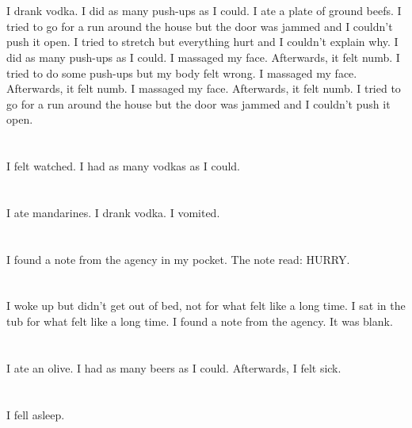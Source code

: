 \documentclass{article}
\begin{document}
    \section{}
    I drank vodka. I did as many push-ups as I could. I ate a plate of ground beefs.  I tried to go for a run around the house but the door was jammed and I couldn't push it open.  I tried to stretch but everything hurt and I couldn't explain why.  I did as many push-ups as I could.  I massaged my face. Afterwards, it felt numb.   I tried to do some push-ups but my body felt wrong.  I massaged my face. Afterwards, it felt numb.  I massaged my face. Afterwards, it felt numb.  I tried to go for a run around the house but the door was jammed and I couldn't push it open.  
    \newpage
    
    \section{}
    I felt watched. I had as many vodkas as I could.  
    \newpage
    
    \section{}
    I ate mandarines. I drank vodka. I vomited.  
    \newpage
    
    \section{}
    I found a note from the agency in my pocket. The note read: HURRY.  
    \newpage
    
    \section{}
    I woke up but didn't get out of bed, not for what felt like a long time. I sat in the tub for what felt like a long time. I found a note from the agency. It was blank.  
    \newpage
    
    \section{}
    I ate an olive. I had as many beers as I could. Afterwards, I felt sick.  
    \newpage
    
    \section{}
    I fell asleep.\\\\ 
    \newpage
    
\end{document}
